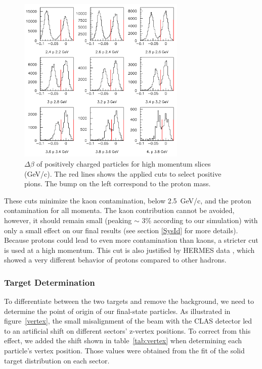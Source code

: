\begin{figure}[tbp]
\centering
\includegraphics[width=8cm] {answer-fig/TofProfile3.png} 
\caption {$\Delta \beta$ of positively charged particles for high momentum slices 
(GeV/c). The red lines shows the applied cuts to select positive pions. The bump on the left
correspond to the proton mass.}
\label{TOF-3}
\end{figure}

These cuts minimize the kaon contamination, below 2.5~GeV/c, and the 
proton contamination for all momenta. The kaon contribution cannot be avoided, however, it should remain small (peaking $\sim$ 3\% according to our simulation) 
with only a small effect on our final results (see section \ref{SysId} 
for more details). Because protons could lead to even more contamination than kaons, 
a stricter cut is used at a high momentum. This cut is also justified by 
HERMES data \cite{Airapetian:2007vu}, which showed a very different behavior of protons compared to other hadrons.

\subsubsection{Target Determination}

To differentiate between the two targets and remove the background, we need to 
determine the point of origin of our final-state particles. As illustrated in figure~\ref{vertex}, the small misalignment of the beam with the CLAS detector led to an artificial shift on different sectors' z-vertex positions. To correct from this effect, we added the shift shown in table~\ref{tab:vertex} when determining each particle's vertex position. Those values were obtained from the fit of the solid target distribution on each sector.

